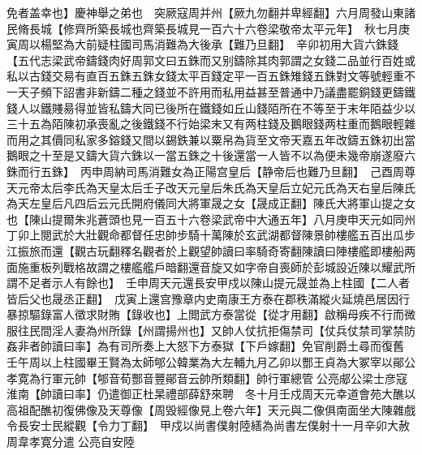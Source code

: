 免者盖幸也】慶神舉之弟也　突厥寇周并州【厥九勿翻并卑經翻】六月周發山東諸民脩長城【修齊所築長城也齊築長城見一百六十六卷梁敬帝太平元年】　秋七月庚寅周以楊堅為大前疑柱國司馬消難為大後承【難乃旦翻】　辛卯初用大貨六銖錢【五代志梁武帝鑄錢肉好周郭文曰五銖而又别鑄除其肉郭謂之女錢二品並行百姓或私以古錢交易有直百五銖五銖女錢太平百錢定平一百五銖雉錢五銖對文等號輕重不一天子頻下詔書非新鑄二種之錢並不許用而私用益甚至普通中乃議盡罷銅錢更鑄鐵錢人以鐵賤昜得並皆私鑄大同已後所在鐵錢如丘山錢陌所在不等至于末年陌益少以三十五為陌陳初承喪亂之後鐵錢不行始梁末又有两柱錢及鵝眼錢两柱重而鵝眼輕雜而用之其價同私家多鎔錢又間以錫鉄兼以粟帛為貨至文帝天嘉五年改鑄五銖初出當鵝眼之十至是又鑄大貨六銖以一當五銖之十後還當一人皆不以為便未幾帝崩遂廢六銖而行五銖】　丙申周納司馬消難女為正陽宫皇后【静帝后也難乃旦翻】　己酉周尊天元帝太后李氏為天皇太后壬子改天元皇后朱氏為天皇后立妃元氏為天右皇后陳氏為天左皇后凡四后云元氏開府儀同大將軍晟之女【晟成正翻】陳氏大將軍山提之女也【陳山提爾朱兆蒼頭也見一百五十六卷梁武帝中大通五年】八月庚申天元如同州　丁卯上閱武於大壯觀命都督任忠帥步騎十萬陳於玄武湖都督陳景帥樓艦五百出瓜步江振旅而還【觀古玩翻釋名觀者於上觀望帥讀曰率騎奇寄翻陳讀曰陣樓艦即樓船两面施重板列戰格故謂之樓艦艦戶暗翻還音旋又如字帝自喪師於彭城設近陳以耀武所謂不足者示人有餘也】　壬申周天元還長安甲戍以陳山提元晟並為上柱國【二人者皆后父也晟丞正翻】　戊寅上還宫豫章内史南康王方泰在郡秩滿縱火延燒邑居因行暴掠驅錄富人徵求財賄【錄收也】上閲武方泰當從【從才用翻】啟稱母疾不行而微服往民間淫人妻為州所錄【州謂揚州也】又帥人仗抗拒傷禁司【仗兵仗禁司掌禁防姦非者帥讀曰率】為有司所奏上大怒下方泰獄【下戶嫁翻】免官削爵土尋而復舊　壬午周以上柱國畢王賢為太師郇公韓業為大左輔九月乙卯以酆王貞為大冢宰以鄖公孝寛為行軍元帥【郇音荀酆音豐鄖音云帥所類翻】帥行軍總管公亮郕公梁士彦寇淮南【帥讀曰率】仍遣御正杜杲禮部薛舒來聘　冬十月壬戍周天元幸道會苑大醮以高祖配醮初復佛像及天尊像【周毁經像見上卷六年】天元與二像俱南面坐大陳雜戲令長安士民縱觀【令力丁翻】　甲戍以尚書僕射陸繕為尚書左僕射十一月辛卯大赦　周韋孝寛分遣公亮自安陸

